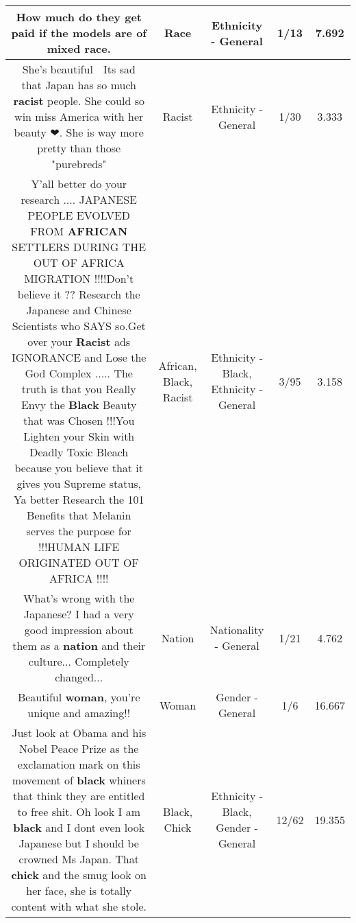 \documentclass[11pt]{article}
\newlength\mylength
\begin{document}
\begin{center}
\begin{longtable}{|C{.65\mylength}|C{.30\mylength}|C{.12\mylength}|C{.12\mylength}|C{.12\mylength}|}
  \small How much do they get paid if the models are of mixed \textbf{race}.\normalsize   & Race & Ethnicity - General & 1/13 & 7.692 \\  \hline
  \small She's beautiful 🤩 Its sad that Japan has so much \textbf{racist} people. She could so win miss America with her beauty ❤. She is way more pretty than those "purebreds"\normalsize   & Racist & Ethnicity - General & 1/30 & 3.333 \\  \hline
  \small Y'all better do your research .... JAPANESE PEOPLE EVOLVED FROM \textbf{AFRICAN} SETTLERS DURING THE OUT OF AFRICA MIGRATION !!!!Don't believe it ??  Research the Japanese and Chinese Scientists who SAYS so.Get over your \textbf{Racist} ads IGNORANCE and Lose the God Complex ..... The truth is that you Really Envy the \textbf{Black} Beauty that was Chosen !!!You Lighten your Skin with Deadly Toxic Bleach because you believe that it gives you Supreme status, Ya better Research the 101 Benefits that Melanin serves the purpose for !!!HUMAN LIFE ORIGINATED OUT OF AFRICA !!!!\normalsize   & African, Black, Racist & Ethnicity - Black, Ethnicity - General & 3/95 & 3.158 \\  \hline
  \small What's wrong with the Japanese? I had a very good impression about them as a \textbf{nation} and their culture... Completely changed...\normalsize   & Nation & Nationality - General & 1/21 & 4.762 \\  \hline
  \small Beautiful \textbf{woman}, you're unique and amazing!!\normalsize   & Woman & Gender - General & 1/6 & 16.667 \\  \hline
  \small Just look at Obama and his Nobel Peace Prize as the exclamation mark on this movement of \textbf{black} whiners that think they are entitled to free shit.  Oh look I am \textbf{black} and I dont even look Japanese but I should be crowned Ms Japan.  That \textbf{chick} and the smug look on her face, she is totally content with what she stole.\normalsize   & Black, Chick & Ethnicity - Black, Gender - General & 12/62 & 19.355 \\  \hline

\end{longtable}
\end{center}
\end{document}
